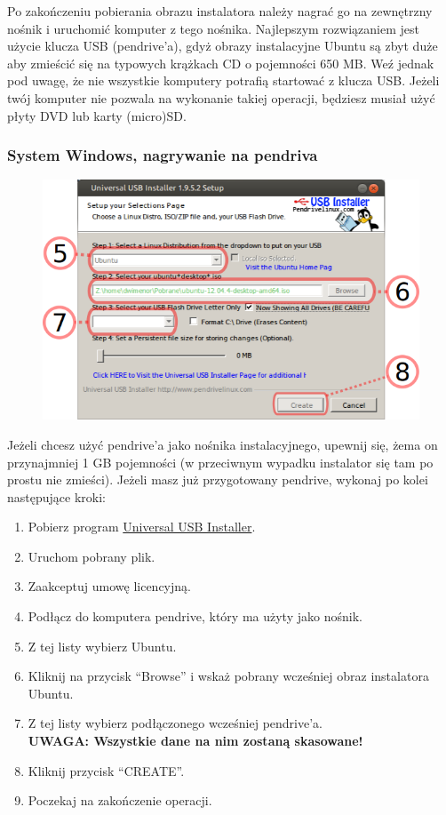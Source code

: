 Po zakończeniu pobierania obrazu instalatora należy nagrać go na zewnętrzny nośnik i uruchomić komputer z tego nośnika. Najlepszym rozwiązaniem jest użycie klucza USB (pendrive'a), gdyż obrazy instalacyjne Ubuntu są zbyt duże aby zmieścić się na typowych krążkach CD o pojemności 650 MB. Weź jednak pod uwagę, że nie wszystkie komputery potrafią startować z klucza USB. Jeżeli twój komputer nie pozwala na wykonanie takiej operacji, będziesz musiał użyć płyty DVD lub karty (micro)SD.
\subsubsection{System Windows, nagrywanie na pendriva}
\begin{figure}
                \includegraphics[width=\linewidth]{images/instalacja_nagrywanie_obrazu.png}
\end{figure}
\noindent Jeżeli chcesz użyć pendrive'a jako nośnika instalacyjnego, upewnij się, żema on przynajmniej 1 GB pojemności (w przeciwnym wypadku instalator się tam po prostu nie zmieści). Jeżeli masz już przygotowany pendrive, wykonaj po kolei następujące kroki:
\begin{enumerate}
\item Pobierz program \href{http://www.pendrivelinux.com/downloads/Universal-USB-Installer/Universal-USB-Installer-1.9.5.2.exe}{Universal USB Installer}.
\item Uruchom pobrany plik.
\item Zaakceptuj umowę licencyjną.
\item Podłącz do komputera pendrive, który ma użyty jako nośnik.
\item Z tej listy wybierz Ubuntu.
\item Kliknij na przycisk “Browse” i wskaż pobrany wcześniej obraz instalatora Ubuntu.
\item Z tej listy wybierz podłączonego wcześniej pendrive'a.\\
\textbf{UWAGA: Wszystkie dane na nim zostaną skasowane!}
\item Kliknij przycisk “CREATE”.
\item Poczekaj na zakończenie operacji.
\end{enumerate}
\clearpage
